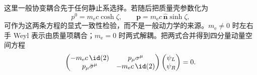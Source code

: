 这里一般协变耦合先于任何静止系选择。若随后把质量壳参数化为
\begin{equation}
 p^0=m_{\mathrm e} c\cosh\zeta,
 \qquad
 \mathbf p=m_{\mathrm e} c\,\hat{\mathbf n}\sinh\zeta,
 \label{eq:rapidity-momentum-r7}
\end{equation}
 可作为这两条方程的显式一致性检验，而不是一般动力学的来源。$m_{\mathrm e}\neq0$ 时左右手 Weyl 表示由质量项耦合；$m_{\mathrm e}=0$ 时两式解耦。把两式合并得到四分量动量空间方程
\begin{equation}
 \begin{pmatrix}
 -m_{\mathrm e} c\,\id(2) & p_\mu\sigma^\mu\\
 p_\mu\bar\sigma^\mu & -m_{\mathrm e} c\,\id(2)
 \end{pmatrix}
 \begin{pmatrix}\psi_L\\\psi_R\end{pmatrix}=0.
 \label{eq:weyl-block-first-order-r7}
\end{equation}

